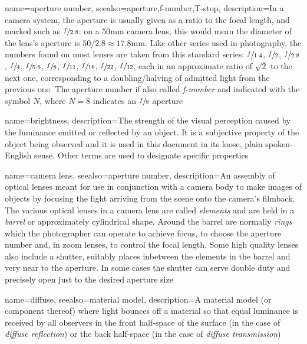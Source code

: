 {
	name={aperture number},
	seealso={aperture,f-number,T-stop},
	description={In a camera system, the aperture is usually given as a ratio to the
		focal length, and marked such as $\sfrac{f}{2.8}$: on a $50\unit{\milli\meter}$ 
		camera lens, this would mean the diameter of the lens's aperture 
		is $50 / 2.8 \approx 17.8\unit{\milli\meter}$. 
		Like other series used in photography, the
		numbers found on most lenses are taken from this standard series:
		$\sfrac{f}{1.4}$, $\sfrac{f}{2}$, $\sfrac{f}{2.8}$, $\sfrac{f}{4}$, $\sfrac{f}{5.6}$,
		$\sfrac{f}{8}$, $\sfrac{f}{11}$, $\sfrac{f}{16}$, $\sfrac{f}{22}$, $\sfrac{f}{32}$,
		each in an approximate ratio of $\sqrt{2}$ to the next one, corresponding to a doubling/halving of admitted light from the previous one.
	    The aperture number if also called \textsl{f-number} and indicated with the symbol
    	$N$, where $N=8$ indicates an $\sfrac{f}{8}$ aperture}
}

{
  name=brightness,
  description={The strength of the visual perception caused by the luminance emitted or
    reflected by an object. It is a subjective property of the object being
    observed and it is used in this document in its loose, 
    plain spoken-English sense. 
    Other terms are used to designate specific properties}
}

{
	name={camera lens},
	seealso={aperture number},
	description={An assembly of optical lenses meant for use in conjunction with a 
		camera body to make images of objects by focusing the light arriving from the scene
		onto the camera's filmback. 
		The various optical lenses in a camera lens are called \textsl{elements} and 
		are held in a \textsl{barrel} or approximately cylindrical shape.
		Around the barrel are normally \textsl{rings} which the photographer can
		operate to achieve focus, to choose the aperture number and, in zoom lenses, to
		control the focal length.
		Some high quality lenses also include a shutter, suitably places inbetween the
		elements in the barrel and very near to the aperture. In some cases the shutter 
		can serve double duty and precisely open just to the desired aperture size}
}

{
	name={diffuse},
	seealso={material model},
	description={A material model (or component thereof) where light bounces off a material
		so that equal luminance is received by all observers in the front half-space of the
		surface (in the case of \textsl{diffuse reflection}) or the back half-space (in the
		case of \textsl{diffuse transmission})}
}


